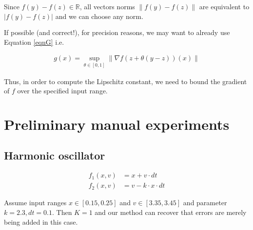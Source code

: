 \documentclass[10pt]{article}
\newcommand{\lv}{\lVert}
\newcommand{\rv}{\rVert}
\newcommand{\eqn}[1]{
 \begin{align} #1
 \end{align}}
\begin{document}
Since $f(y) - f(z) \in \mathbb{R}$, all vectors norms $\lv f(y) - f(z) \rv$
are equivalent to $|f(y) - f(z)|$ and we can choose any norm.

If possible (and correct!), for precision reasons, we may want to already use Equation \ref{eqnG}  i.e.
\eqn{
  g(x) = \sup\limits_{\theta\in [0,1]} \lv \nabla f(z + \theta(y-z))(x)\rv
}

Thus, in order to compute the Lipschitz constant, we need to bound the gradient of $f$
over the specified input range.




\section{Preliminary manual experiments}

\subsection{Harmonic oscillator}
\eqn{
  f_1(x, v) &= x + v \cdot dt\\
  f_2(x, v) &= v - k \cdot x \cdot dt
}

Assume input ranges $x \in [0.15, 0.25]$ and $v \in [3.35, 3.45]$
and parameter $k = 2.3, dt = 0.1$.
Then $K = 1$ and our method can recover that errors are merely being added in this case.
\end{document}
